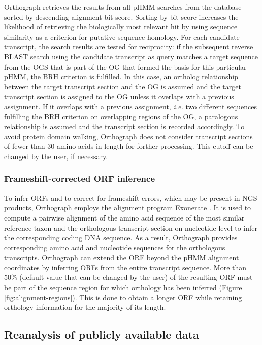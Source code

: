 Orthograph retrieves the results from all pHMM searches from the
database sorted by descending alignment bit score. Sorting by bit score
increases the likelihood of retrieving the biologically most relevant
hit by using sequence similarity as a criterion for putative sequence
homology. For each candidate transcript, the search results are tested
for reciprocity: if the subsequent reverse BLAST search using the
candidate transcript as query matches a target sequence from the OGS
that is part of the OG that formed the basis for this particular pHMM,
the BRH criterion is fulfilled. In this case, an ortholog relationship
between the target transcript section and the OG is assumed and the
target transcript section is assigned to the OG unless it overlaps with
a previous assignment. If it overlaps with a previous assignment,
\emph{i.e.} two different sequences fulfilling the BRH criterion on
overlapping regions of the OG, a paralogous relationship is assumed and
the transcript section is recorded accordingly. To avoid protein domain
walking, Orthograph does not consider transcript sections of fewer than
30 amino acids in length for forther processing. This cutoff can be
changed by the user, if necessary.

\subsubsection{Frameshift-corrected ORF
inference}\label{frameshift-corrected-orf-inference}

To infer ORFs and to correct for frameshift errors, which may be present
in NGS products, Orthograph employs the alignment program Exonerate
\citep{Slater2005}. It is used to compute a pairwise alignment of the
amino acid sequence of the most similar reference taxon and the
orthologous transcript section on nucleotide level to infer the
corresponding coding DNA sequence. As a result, Orthograph provides
corresponding amino acid and nucleotide sequences for the orthologous
transcripts. Orthograph can extend the ORF beyond the pHMM alignment
coordinates by inferring ORFs from the entire transcript sequence. More
than 50\% (default value that can be changed by the user) of the
resulting ORF must be part of the sequence region for which orthology
has been inferred (Figure \ref{fig:alignment-regions}). This is done to obtain a longer ORF while
retaining orthology information for the majority of its length.

\subsection{Reanalysis of publicly available
data}\label{reanalysis-of-publicly-available-data}

